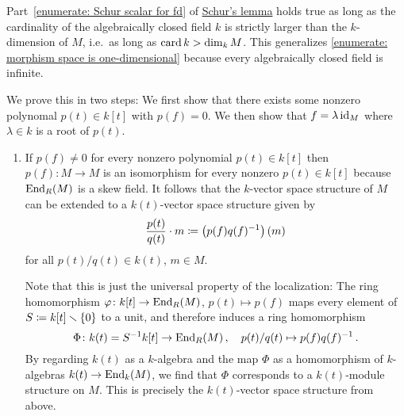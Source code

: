 

\begin{remark}
  \label{remark: Schur for cardinality big enough}
  Part~\ref*{enumerate: Schur scalar for fd} of \hyperref[proposition: schurs lemma for modules]{Schur’s lemma} holds true as long as the cardinality of the algebraically closed field $k$ is strictly larger than the $k$-dimension of $M$, i.e.\ as long as $\operatorname{card} k > \dim_k M$.
  This generalizes \ref*{enumerate: morphism space is one-dimensional} because every algebraically closed field is infinite.

  We prove this in two steps:
  We first show that there exists some nonzero polynomal $p(t) \in k[t]$ with $p(f) = 0$.
  We then show that $f = \lambda \operatorname{id}_M$ where $\lambda \in k$ is a root of $p(t)$.
  \begin{enumerate}[label=\arabic*)]
    \item
      If $p(f) \neq 0$ for every nonzero polynomial $p(t) \in k[t]$ then $p(f) \colon M \to M$ is an isomorphism for every nonzero $p(t) \in k[t]$ because $\operatorname{End}_R(M)$ is a skew field.
      It follows that the $k$-vector space structure of $M$ can be extended to a $k(t)$-vector space structure given by
      \[
                  \frac{p(t)}{q(t)} \cdot m
        \coloneqq  \left( p(f) q(f)^{-1} \right)(m)
      \]
      for all $p(t)/q(t) \in k(t)$, $m \in M$.
      
      Note that this is just the universal property of the localization:
      The ring homomorphism $\varphi \colon k[t] \to \operatorname{End}_R(M)$, $p(t) \mapsto p(f)$ maps every element of $S \coloneqq k[t] \smallsetminus \{0\}$ to a unit, and therefore induces a ring homomorphism
      \[
                \Phi
        \colon  k(t)
        =       S^{-1} k[t]
        \to     \operatorname{End}_R(M) \,,
        \quad   p(t)/q(t)
        \mapsto p(f) q(f)^{-1} \,.
      \]
      By regarding $k(t)$ as a $k$-algebra and the map $\Phi$ as a homomorphism of $k$-algebras $k(t) \to \operatorname{End}_k(M)$, we find that $\Phi$ corresponds to a $k(t)$-module structure on $M$.
      This is precisely the $k(t)$-vector space structure from above.
      

\end{enumerate}
\end{remark}
